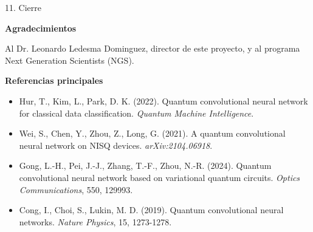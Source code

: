 \documentclass[aspectratio=169]{beamer}
\newcommand{\bmheading}[2]{\textbf{\color{#1}#2}\par\smallskip}
\begin{document}
\begin{frame}{11. Cierre}
  \vspace{6pt}
  \begin{indigobox}
    \bmheading{bmIndigo}{Agradecimientos}
    Al Dr. Leonardo Ledesma Dominguez, director de este proyecto, y al
    programa Next Generation Scientists (NGS).
  \end{indigobox}

  \vspace{12pt}

  \bmheading{bmIndigo}{Referencias principales}
  \begin{itemize}
    \small
    \item Hur, T., Kim, L., Park, D. K. (2022). Quantum convolutional neural
      network for classical data classification. \textit{Quantum Machine
      Intelligence}.
    \item Wei, S., Chen, Y., Zhou, Z., Long, G. (2021). A quantum
      convolutional neural network on NISQ devices. \textit{arXiv:2104.06918}.
    \item Gong, L.-H., Pei, J.-J., Zhang, T.-F., Zhou, N.-R. (2024). Quantum
      convolutional neural network based on variational quantum circuits.
      \textit{Optics Communications}, 550, 129993.
    \item Cong, I., Choi, S., Lukin, M. D. (2019). Quantum convolutional
      neural networks. \textit{Nature Physics}, 15, 1273-1278.
  \end{itemize}
\end{frame}
\end{document}

